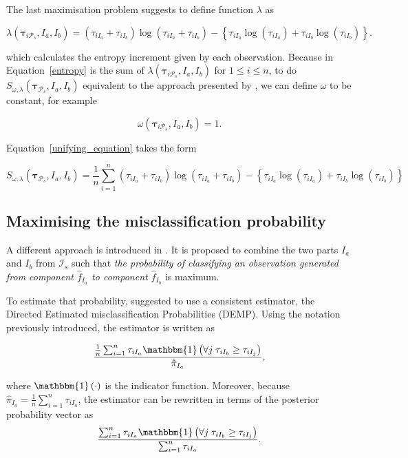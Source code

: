 \documentclass[10pt, a4paper]{article}
\newcommand{\m}[1]{\boldsymbol{#1}}
\begin{document}
\begin{spacing}{1.9}
The last maximisation problem suggests to define function $\lambda$ as

\[
\lambda(\m\tau_{i \mathcal{P}_s},  I_a,  I_b) =  (\tau_{iI_a}+\tau_{iI_b}) \log(\tau_{iI_a} + \tau_{iI_b}) - \left\{ \tau_{iI_a} \log(\tau_{iI_a}) + \tau_{iI_b} \log(\tau_{iI_b}) \right\}.
\]

which calculates the entropy increment given by each observation. Because in Equation~\ref{entropy} is the sum of $\lambda(\m\tau_{i \mathcal{P}_s},  I_a,  I_b)$ for $1 \leq i \leq n$, to do $S_{\omega, \lambda}( \m\tau_{\mathcal{P}_s},  I_a,  I_b) $ equivalent to the approach presented by \cite{baudry2010combining}, we can define $\omega$ to be constant, for example 

\[
\omega(\m\tau_{i \mathcal{P}_s},  I_a,  I_b) = 1.
\]

Equation~\ref{unifying_equation} takes the form

\[
S_{\omega, \lambda}( \m\tau_{\mathcal{P}_s},  I_a,  I_b) = \frac{1}{n} \sum_{i=1}^n (\tau_{iI_a}+\tau_{iI_b}) \log(\tau_{iI_a} + \tau_{iI_b}) - \left\{ \tau_{iI_a} \log(\tau_{iI_a}) + \tau_{iI_b} \log(\tau_{iI_b}) \right\}
\]


\subsection{Maximising the misclassification probability}

A different approach is introduced in \cite{hennig2010methods}. It is proposed to combine the two parts $I_a$ and $I_b$ from $ \mathcal{I}_s$ such that \emph{the probability of classifying an observation generated from component $\hat{f}_{I_a}$ to component $\hat{f}_{I_b}$} is maximum.

To estimate that probability,  \cite{hennig2010methods} suggested to use a consistent estimator, the Directed Estimated misclassification Probabilities (DEMP). Using the notation previously introduced, the estimator is written as

\[
\frac{ \frac{1}{n} \sum_{i=1}^n {\tau_{iI_a} \mathbbm{1}\left( \forall j\; \tau_{i I_{b}} \geq \tau_{iI_j} \right)}}{ \hat{\pi}_{I_a}},
\]

where $\mathbbm{1}\left( \cdot \right)$ is the indicator function. Moreover, because $ \hat{\pi}_{I_a} = \frac{1}{n} \sum_{i=1}^n \tau_{iI_a}$, the estimator can be rewritten in terms of the posterior probability vector as
\begin{equation}\label{demp_criteria}
\frac{ \sum_{i=1}^n {\tau_{iI_a} \mathbbm{1}\left( \forall j\; \tau_{i I_{b}} \geq \tau_{iI_j} \right)}}{\sum_{i=1}^n \tau_{iI_a} }.
\end{equation}


\end{spacing}
\end{document}
